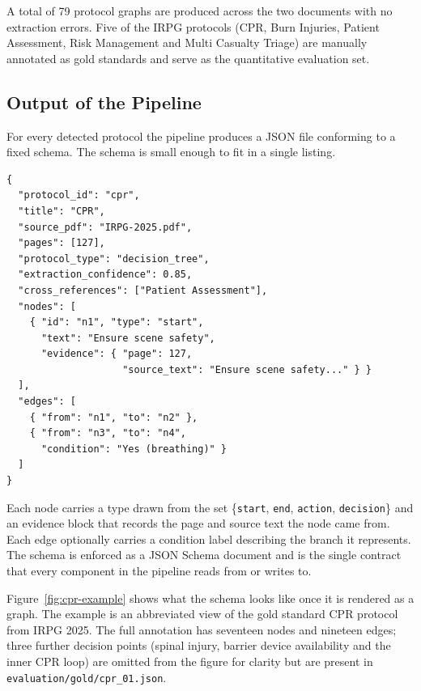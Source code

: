 \documentclass{article}
\begin{document}
A total of 79 protocol graphs are produced across the two documents
with no extraction errors. Five of the IRPG protocols (CPR, Burn
Injuries, Patient Assessment, Risk Management and Multi Casualty
Triage) are manually annotated as gold standards and serve as the
quantitative evaluation set.

\subsection{Output of the Pipeline}

For every detected protocol the pipeline produces a JSON file
conforming to a fixed schema. The schema is small enough to fit in a
single listing.

\begin{tcolorbox}[colback=mygray, colframe=mygray, sharp corners, boxrule=0pt]
\begin{verbatim}
{
  "protocol_id": "cpr",
  "title": "CPR",
  "source_pdf": "IRPG-2025.pdf",
  "pages": [127],
  "protocol_type": "decision_tree",
  "extraction_confidence": 0.85,
  "cross_references": ["Patient Assessment"],
  "nodes": [
    { "id": "n1", "type": "start",
      "text": "Ensure scene safety",
      "evidence": { "page": 127,
                    "source_text": "Ensure scene safety..." } }
  ],
  "edges": [
    { "from": "n1", "to": "n2" },
    { "from": "n3", "to": "n4",
      "condition": "Yes (breathing)" }
  ]
}
\end{verbatim}
\end{tcolorbox}

Each node carries a type drawn from the set
\{\texttt{start}, \texttt{end}, \texttt{action}, \texttt{decision}\}
and an evidence block that records the page and source text the node
came from. Each edge optionally carries a condition label describing
the branch it represents. The schema is enforced as a JSON Schema
document and is the single contract that every component in the
pipeline reads from or writes to.

Figure~\ref{fig:cpr-example} shows what the schema looks like once it
is rendered as a graph. The example is an abbreviated view of the
gold standard CPR protocol from IRPG 2025. The full annotation has
seventeen nodes and nineteen edges; three further decision points
(spinal injury, barrier device availability and the inner CPR loop)
are omitted from the figure for clarity but are present in
\texttt{evaluation/gold/cpr\_01.json}.
\end{document}
